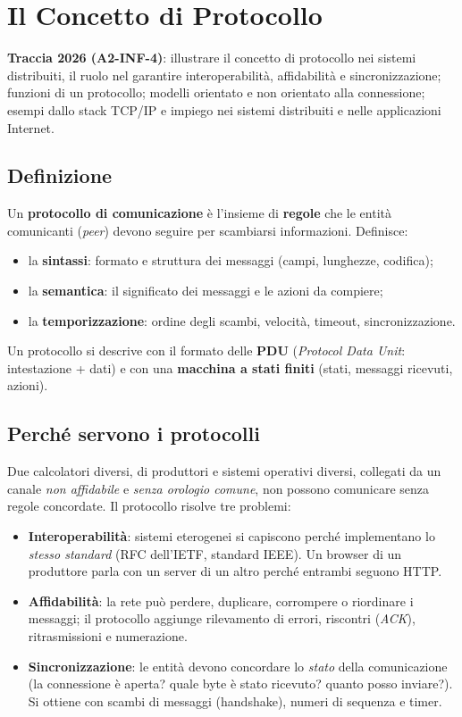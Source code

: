 \bigskip
{}

\section{Il Concetto di Protocollo}
\textbf{Traccia 2026 (A2-INF-4)}: illustrare il concetto di protocollo nei sistemi distribuiti, il ruolo nel garantire interoperabilità, affidabilità e sincronizzazione; funzioni di un protocollo; modelli orientato e non orientato alla connessione; esempi dallo stack TCP/IP e impiego nei sistemi distribuiti e nelle applicazioni Internet.

\subsection{Definizione}
Un \textbf{protocollo di comunicazione} è l'insieme di \textbf{regole} che le entità comunicanti (\emph{peer}) devono seguire per scambiarsi informazioni. Definisce:
\begin{itemize}
    \item la \textbf{sintassi}: formato e struttura dei messaggi (campi, lunghezze, codifica);
    \item la \textbf{semantica}: il significato dei messaggi e le azioni da compiere;
    \item la \textbf{temporizzazione}: ordine degli scambi, velocità, timeout, sincronizzazione.
\end{itemize}
Un protocollo si descrive con il formato delle \textbf{PDU} (\emph{Protocol Data Unit}: intestazione + dati) e con una \textbf{macchina a stati finiti} (stati, messaggi ricevuti, azioni).

\subsection{Perché servono i protocolli}
Due calcolatori diversi, di produttori e sistemi operativi diversi, collegati da un canale \emph{non affidabile} e \emph{senza orologio comune}, non possono comunicare senza regole concordate. Il protocollo risolve tre problemi:
\begin{itemize}
    \item \textbf{Interoperabilità}: sistemi eterogenei si capiscono perché implementano lo \emph{stesso standard} (RFC dell'IETF, standard IEEE). Un browser di un produttore parla con un server di un altro perché entrambi seguono HTTP.
    \item \textbf{Affidabilità}: la rete può perdere, duplicare, corrompere o riordinare i messaggi; il protocollo aggiunge rilevamento di errori, riscontri (\emph{ACK}), ritrasmissioni e numerazione.
    \item \textbf{Sincronizzazione}: le entità devono concordare lo \emph{stato} della comunicazione (la connessione è aperta? quale byte è stato ricevuto? quanto posso inviare?). Si ottiene con scambi di messaggi (handshake), numeri di sequenza e timer.
\end{itemize}

